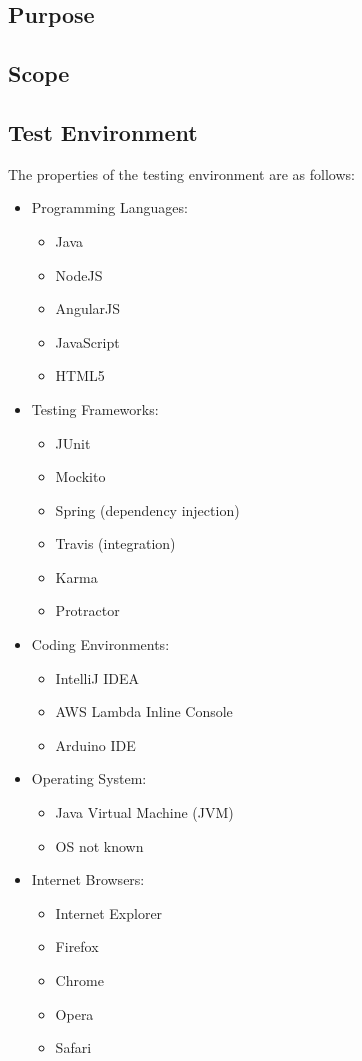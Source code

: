 \documentclass{article}
\begin{document}
	\subsection{Purpose}
	
	\subsection{Scope}
		
	\subsection{Test Environment}
	
		The properties of the testing environment are as follows:
		\begin{itemize}
			\item Programming Languages:
				\begin{itemize}
					\item Java
					\item NodeJS
					\item AngularJS
					\item JavaScript
					\item HTML5
				\end{itemize}
			\item Testing Frameworks:
				\begin{itemize}
					\item JUnit
					\item Mockito
					\item Spring (dependency injection)
					\item Travis (integration)
					\item Karma
					\item Protractor
				\end{itemize}
			\item Coding Environments:
				\begin{itemize}
					\item IntelliJ IDEA
					\item AWS Lambda Inline Console
					\item Arduino IDE
				\end{itemize}
			\item Operating System:
				\begin{itemize}
					\item Java Virtual Machine (JVM)
					\item OS not known
				\end{itemize}
			\item Internet Browsers:
				\begin{itemize}
					\item Internet Explorer
					\item Firefox
					\item Chrome
					\item Opera
					\item Safari
				\end{itemize}
		\end{itemize}
	
\end{document}
